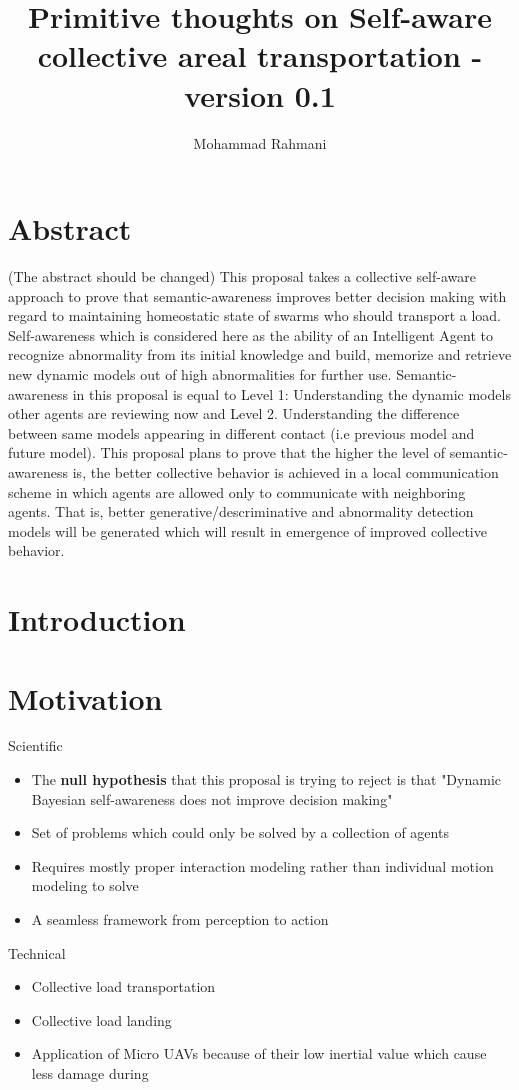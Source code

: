 \documentclass{article}
\begin{document}
	
	\title{Primitive thoughts on Self-aware collective areal transportation - version 0.1}
	\author{Mohammad Rahmani}
	\date{}
	\maketitle
	\section{Abstract}
	(The abstract should be changed)
	This proposal takes a collective self-aware approach to prove that semantic-awareness improves better decision making with regard to maintaining homeostatic state of swarms who should transport a load. Self-awareness which is considered here as the ability of an Intelligent Agent to recognize abnormality from its initial knowledge and build, memorize and retrieve new dynamic models out of high abnormalities for further use. Semantic-awareness in this proposal is equal to  Level 1: Understanding the dynamic models other agents are reviewing now and Level 2. Understanding the difference between same models appearing in different contact (i.e previous model and future model). This proposal plans to prove that the higher the level of semantic-awareness is, the better collective behavior is achieved in a local communication scheme in which agents are allowed only to communicate with neighboring agents. That is, better generative/descriminative and abnormality detection models will be generated which will result in emergence of improved collective behavior.   
	\section{Introduction}
	
	
	\section{Motivation}
		Scientific
		\begin{itemize}
			\item The \textbf{null hypothesis} that this proposal is trying to reject is that "Dynamic Bayesian self-awareness does not improve decision making"
			\item Set of problems which could only be solved by a collection of agents
			\item Requires mostly proper interaction modeling rather than individual motion modeling to solve
			\item A seamless framework from perception to action
		\end{itemize}
		Technical
		\begin{itemize}
			\item Collective load transportation
			\item Collective load landing
			\item Application of Micro UAVs because of their low inertial value which cause less damage during 
		\end{itemize}
	
\end{document}
